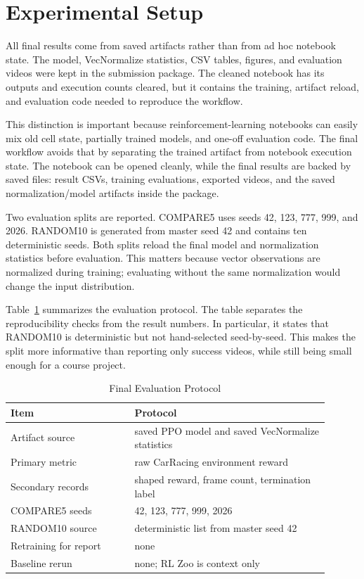 \documentclass[conference]{IEEEtran}
\begin{document}
\section{Experimental Setup}

All final results come from saved artifacts rather than from ad hoc notebook state. The model, VecNormalize statistics, CSV tables, figures, and evaluation videos were kept in the submission package. The cleaned notebook has its outputs and execution counts cleared, but it contains the training, artifact reload, and evaluation code needed to reproduce the workflow.

This distinction is important because reinforcement-learning notebooks can easily mix old cell state, partially trained models, and one-off evaluation code. The final workflow avoids that by separating the trained artifact from notebook execution state. The notebook can be opened cleanly, while the final results are backed by saved files: result CSVs, training evaluations, exported videos, and the saved normalization/model artifacts inside the package.

Two evaluation splits are reported. COMPARE5 uses seeds 42, 123, 777, 999, and 2026. RANDOM10 is generated from master seed 42 and contains ten deterministic seeds. Both splits reload the final model and normalization statistics before evaluation. This matters because vector observations are normalized during training; evaluating without the same normalization would change the input distribution.

Table~\ref{tab:protocol} summarizes the evaluation protocol. The table separates the reproducibility checks from the result numbers. In particular, it states that RANDOM10 is deterministic but not hand-selected seed-by-seed. This makes the split more informative than reporting only success videos, while still being small enough for a course project.

\begin{table}[t]
\caption{Final Evaluation Protocol}
\label{tab:protocol}
\centering
\scriptsize
\begin{tabular}{p{0.35\linewidth}p{0.55\linewidth}}
\toprule
Item & Protocol \\
\midrule
Artifact source & saved PPO model and saved VecNormalize statistics \\
Primary metric & raw CarRacing environment reward \\
Secondary records & shaped reward, frame count, termination label \\
COMPARE5 seeds & 42, 123, 777, 999, 2026 \\
RANDOM10 source & deterministic list from master seed 42 \\
Retraining for report & none \\
Baseline rerun & none; RL Zoo is context only \\
\bottomrule
\end{tabular}
\end{table}
\end{document}
